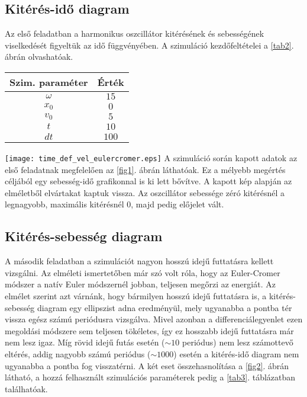 \begin{multicols}{2}
\subsection{Kitérés-idő diagram}
Az első feladatban a harmonikus oszcillátor kitérésének és sebességének viselkedését figyeltük az idő függvényében. A szimuláció kezdőfeltételei a \ref{tab2}. ábrán olvashatóak.
\begin{center}
\begin{tabular}{c|c}
Szim. paraméter & Érték \\
\hline \hline
$\omega$ & $15$ \\
\hline
$x_{0}$ & $0$ \\
\hline
$v_{0}$ & $5$ \\
\hline
$t$ & $10$ \\
\hline
$dt$ & $100$ \\
\hline
\end{tabular}
\end{center}
\label{tab2}
\hfill \break \hfill \break
{\centering\texttt{[image: time\_def\_vel\_eulercromer.eps]}}
\label{fig1}
\hfill \break \hfill \break
A szimuláció során kapott adatok az első feladatnak megfelelően az \ref{fig1}. ábrán láthatóak. Ez a mélyebb megértés céljából egy sebesség-idő grafikonnal is ki lett bővítve. A kapott kép alapján az elméletből elvártakat kaptuk vissza. Az oszcillátor sebessége zéró kitérésnél a legnagyobb, maximális kitérésnél $0$, majd pedig előjelet vált.

\subsection{Kitérés-sebesség diagram}
A második feladatban a szimulációt nagyon hosszú idejű futtatásra kellett vizsgálni. Az elméleti ismertetőben már szó volt róla, hogy az Euler-Cromer módszer a natív Euler módszernél jobban, teljesen megőrzi az energiát. Az elmélet szerint azt várnánk, hogy bármilyen hosszú idejű futtatásra is, a kitérés-sebesség diagram egy ellipszist adna eredményül, mely ugyanabba a pontba tér vissza egész számú periódusra vizsgálva. Mivel azonban a differenciálegyenlet ezen megoldási módszere sem teljesen tökéletes, így ez hosszabb idejű futtatásra már nem lesz igaz. Míg rövid idejű futás esetén ($\sim 10$ periódus) nem lesz számottevő eltérés, addig nagyobb számú periódus ($\sim 1000$) esetén a kitérés-idő diagram nem ugyanabba a pontba fog visszatérni. A két eset összehasnolítása a \ref{fig2}. ábrán látható, a hozzá felhasznált szimulációs paraméterek pedig a \ref{tab3}. táblázatban találhatóak.


\end{multicols}
